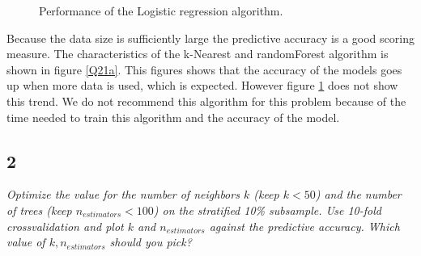 \documentclass[a4paper,12pt]{article}
\begin{document}
{\begin{figure}[H]
\hfill
{}
\hfill
\caption{Performance of the Logistic regression algorithm.}
\label{Q21b}
\end{figure}

\textnormal{Because the data size is sufficiently large the predictive accuracy is a good scoring measure. The characteristics of the k-Nearest and randomForest algorithm is shown in figure \ref{Q21a}. This figures shows that the accuracy of the models goes up when more data is used, which is expected. However figure \ref{Q21b} does not show this trend. We do not recommend this algorithm for this problem because of the time needed to train this algorithm and the accuracy of the model.}


\subsection*{2}
{\it Optimize the value for the number of neighbors $k$ (keep $k < 50$) and the number of trees
(keep $n_{estimators} < 100$) on the stratified 10\% subsample. Use 10-fold crossvalidation and plot $k$ and $n_{estimators}$ against the predictive accuracy. Which value of $k, n_{estimators}$ should you pick?}\\

}
\end{document}
